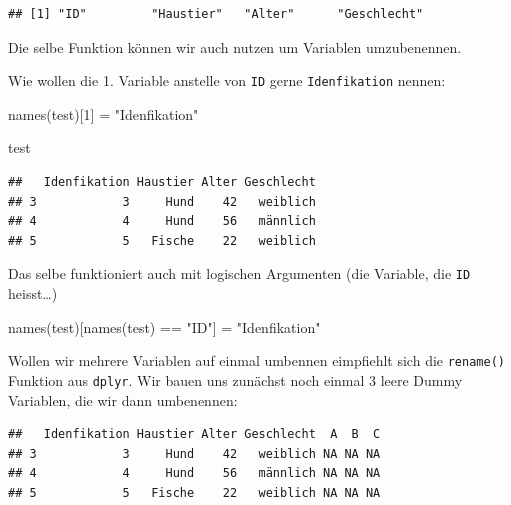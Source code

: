 \documentclass[
]{book}
\newenvironment{Shaded}{\begin{snugshade}}{\end{snugshade}}
\newcommand{\ConstantTok}[1]{\textcolor[rgb]{0.00,0.00,0.00}{#1}}
\newcommand{\DecValTok}[1]{\textcolor[rgb]{0.00,0.00,0.81}{#1}}
\newcommand{\FunctionTok}[1]{\textcolor[rgb]{0.00,0.00,0.00}{#1}}
\newcommand{\NormalTok}[1]{#1}
\newcommand{\OtherTok}[1]{\textcolor[rgb]{0.56,0.35,0.01}{#1}}
\newcommand{\SpecialCharTok}[1]{\textcolor[rgb]{0.00,0.00,0.00}{#1}}
\newcommand{\StringTok}[1]{\textcolor[rgb]{0.31,0.60,0.02}{#1}}
\begin{document}
\begin{verbatim}
## [1] "ID"         "Haustier"   "Alter"      "Geschlecht"
\end{verbatim}

Die selbe Funktion können wir auch nutzen um Variablen umzubenennen.

Wie wollen die 1. Variable anstelle von \texttt{ID} gerne \texttt{Idenfikation} nennen:

\begin{Shaded}
\begin{Highlighting}[]
\FunctionTok{names}\NormalTok{(test)[}\DecValTok{1}\NormalTok{] }\OtherTok{=} \StringTok{"Idenfikation"}

\NormalTok{test}
\end{Highlighting}
\end{Shaded}

\begin{verbatim}
##   Idenfikation Haustier Alter Geschlecht
## 3            3     Hund    42   weiblich
## 4            4     Hund    56   männlich
## 5            5   Fische    22   weiblich
\end{verbatim}

Das selbe funktioniert auch mit logischen Argumenten (die Variable, die \texttt{ID} heisst\ldots)

\begin{Shaded}
\begin{Highlighting}[]
\FunctionTok{names}\NormalTok{(test)[}\FunctionTok{names}\NormalTok{(test) }\SpecialCharTok{==} \StringTok{"ID"}\NormalTok{] }\OtherTok{=} \StringTok{"Idenfikation"}
\end{Highlighting}
\end{Shaded}

Wollen wir mehrere Variablen auf einmal umbennen eimpfiehlt sich die \texttt{rename()} Funktion aus \texttt{dplyr}. Wir bauen uns zunächst noch einmal 3 leere Dummy Variablen, die wir dann umbenennen:

\begin{Shaded}
\end{Shaded}

\begin{verbatim}
##   Idenfikation Haustier Alter Geschlecht  A  B  C
## 3            3     Hund    42   weiblich NA NA NA
## 4            4     Hund    56   männlich NA NA NA
## 5            5   Fische    22   weiblich NA NA NA
\end{verbatim}
\end{document}
